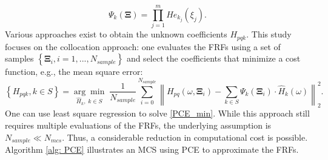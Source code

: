 \begin{equation}
    \Psi_{k} \left(\mathbf{\Xi}\right)
    =
    \prod_{j=1}^{m}{
        {He}_{k_{j}} \left(\xi_{j}\right)
    }.
    \label{prob Hermite products}
\end{equation}
Various approaches exist to obtain the unknown coefficients $H_{pqk}$.
{This study focuses on the collocation approach: one evaluates the FRFs using a set of samples $\left\{\mathbf{\Xi}_{i}, i = 1, ..., N_{sample}\right\}$ and select the coefficients that minimize a cost function, e.g., the mean square error:}%
\begin{equation}
    \left\{
        H_{pqk}, k \in S
    \right\}
    =
    \underset{\hat{H}_{k}, \; k \in S}{\arg\min}
    \;
    \frac{1}{N_{sample}}
    \sum_{i=0}^{N_{sample}}
    \left\|
        H_{pq} \left(\omega, \mathbf{\Xi}_{i}\right)
        -
        \sum_{k\in S}{
            \Psi_{k} \left(\mathbf{\Xi}_{i}\right)
            \cdot
            \hat{H}_{k} \left(\omega\right)
        }
    \right\|_{2}^{2}.
    \label{PCE_min}
\end{equation}
One can use least square regression to solve \eqref{PCE_min}.
While this approach still requires multiple evaluations of the FRFs, the underlying assumption is $N_{sample}\ll N_{mcs}$.
Thus, a considerable reduction in computational cost is possible.
Algorithm \ref{alg: PCE} illustrates an MCS using PCE to approximate the FRFs.
